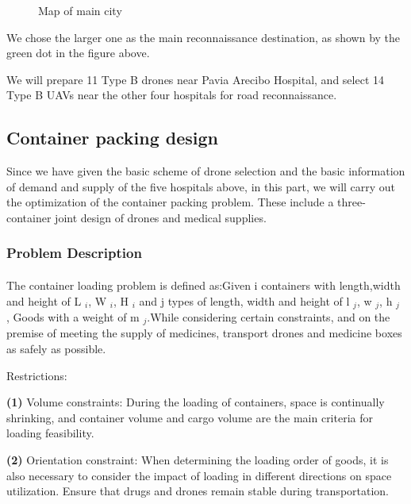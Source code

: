 \documentclass{article} %
\begin{document}
\begin{figure}[htb] 
 \caption{\label{1}Map of main city} 
 \end{figure}
We chose the larger one as the main reconnaissance destination, as shown by the green dot in the figure above.


We will prepare 11 Type B drones near Pavia Arecibo Hospital, and select 14 Type B UAVs near the other four hospitals for road reconnaissance.
\subsection{Container packing design}
Since we have given the basic scheme of drone selection and the basic information of demand and supply of the five hospitals above, in this part, we will carry out the optimization of the container packing problem. These include a three-container joint design of drones and medical supplies.
\subsubsection{Problem Description} 
\paragraph{}The container loading problem is defined as:Given i containers with length,width and height of L $ _i $, W $ _i $, H $ _i $ and j types of length, width and height of l $ _j $, w $ _j $, h $ _j $ , Goods with a weight of m $ _j $.While considering certain constraints, and on the premise of meeting the supply of medicines, transport drones and medicine boxes as safely as possible.


Restrictions:

         \textbf{(1)} Volume constraints: During the loading of containers, space is continually shrinking, and container volume and cargo volume are the main criteria for loading feasibility.

         \textbf{(2)} Orientation constraint: When determining the loading order of goods, it is also necessary to consider the impact of loading in different directions on space utilization. Ensure that drugs and drones remain stable during transportation.
\end{document}
